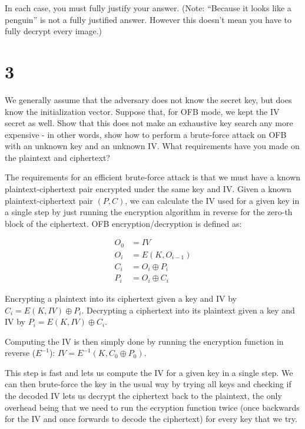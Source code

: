 \documentclass[11pt]{article}
\begin{document}
In each case, you must fully justify your answer. (Note: “Because it looks like a penguin” is not a fully justiﬁed answer. However this doesn’t mean you have to fully decrypt every image.)

\newpage

\section{3}

We generally assume that the adversary does not know the secret key, but does know the initialization vector. Suppose that, for OFB mode, we kept the IV secret as well. Show that this does not make an exhaustive key search any more expensive - in other words, show how to perform a brute-force attack on OFB with an unknown key and an unknown IV. What requirements have you made on the plaintext and ciphertext?

The requirements for an efficient brute-force attack is that we must have a known plaintext-ciphertext pair encrypted under the same key and IV. Given a known plaintext-ciphertext pair $(P, C)$, we can calculate the IV used for a given key in a single step by just running the encryption algorithm in reverse for the zero-th block of the ciphertext. OFB encryption/decryption is defined as:

\begin{align*}
    O_0 &= IV \\
    O_i &= E(K, O_{i-1}) \\
    C_i &= O_i \oplus P_i \\
    P_i &= O_i \oplus C_i
\end{align*}


Encrypting a plaintext into its ciphertext given a key and IV by $C_i = E(K, IV) \oplus P_i$.
Decrypting a ciphertext into its plaintext given a key and IV by $P_i = E(K, IV) \oplus C_i$.

Computing the IV is then simply done by running the encryption function in reverse ($E^{-1}$): $IV = E^{-1}(K, C_0 \oplus P_0)$.

This step is fast and lets us compute the IV for a given key in a single step. We can then brute-force the key in the usual way by trying all keys and checking if the decoded IV lets us decrypt the ciphertext back to the plaintext, the only overhead being that we need to run the ecryption function twice (once backwards for the IV and once forwards to decode the ciphertext) for every key that we try.

\newpage
\end{document}
